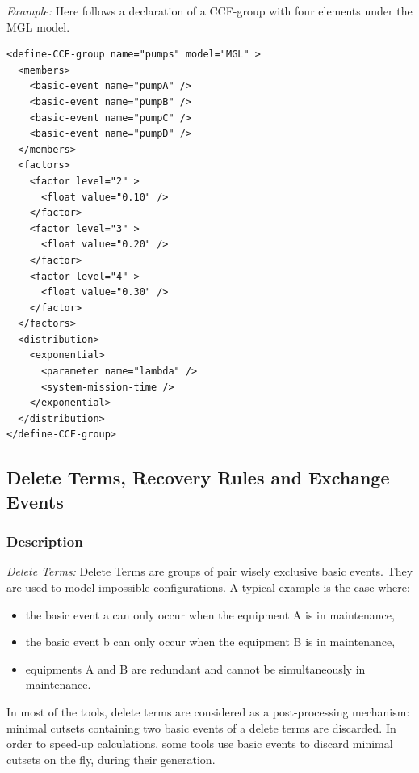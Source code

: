 \documentclass[11pt]{article}
\begin{document}
\emph{Example:} Here follows a declaration of a CCF-group with four elements
under the MGL model.

\lstset{language=XML,label= ,caption= ,captionpos=b,numbers=none}
\begin{lstlisting}
<define-CCF-group name="pumps" model="MGL" >
  <members>
    <basic-event name="pumpA" />
    <basic-event name="pumpB" />
    <basic-event name="pumpC" />
    <basic-event name="pumpD" />
  </members>
  <factors>
    <factor level="2" >
      <float value="0.10" />
    </factor>
    <factor level="3" >
      <float value="0.20" />
    </factor>
    <factor level="4" >
      <float value="0.30" />
    </factor>
  </factors>
  <distribution>
    <exponential>
      <parameter name="lambda" />
      <system-mission-time />
    </exponential>
  </distribution>
</define-CCF-group>
\end{lstlisting}



\subsection{Delete Terms, Recovery Rules and Exchange Events}
\label{sec:org84f9713}

\subsubsection{Description}
\label{sec:org51d0d1a}

\emph{Delete Terms:} Delete Terms are groups of pair wisely exclusive basic
events. They are used to model impossible configurations. A typical
example is the case where:

\begin{itemize}
\item the basic event a can only occur when the equipment A is in
maintenance,

\item the basic event b can only occur when the equipment B is in
maintenance,

\item equipments A and B are redundant and cannot be simultaneously in
maintenance.
\end{itemize}

In most of the tools, delete terms are considered as a post-processing
mechanism: minimal cutsets containing two basic events of a delete terms
are discarded. In order to speed-up calculations, some tools use basic
events to discard minimal cutsets on the fly, during their generation.
\end{document}
